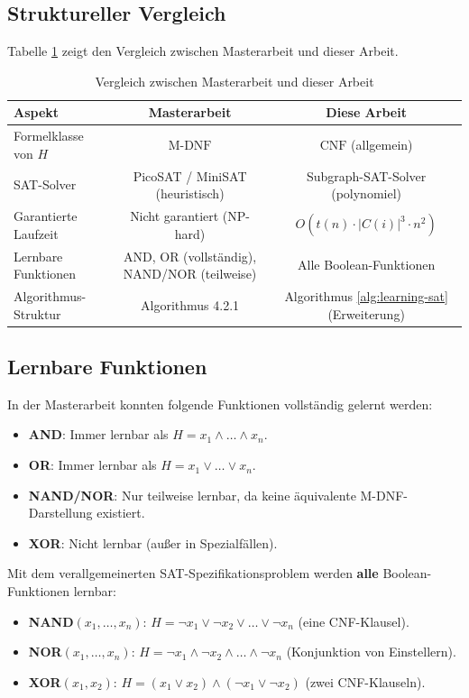 ﻿\documentclass[a4paper,12pt]{article}
\theoremstyle{definition}
\begin{document}
\subsection{Struktureller Vergleich}
Tabelle \ref{tab:vergleich} zeigt den Vergleich zwischen Masterarbeit und dieser Arbeit.
\begin{table}
    \begin{tabular}{|l|c|c|}
        \hline
        \textbf{Aspekt} & \textbf{Masterarbeit \cite{Epp13}} & \textbf{Diese Arbeit} \\
        \hline
        Formelklasse von $H$ & $\text{M-DNF}$ & $\text{CNF}$ (allgemein) \\
        SAT-Solver & PicoSAT / MiniSAT (heuristisch) & Subgraph-SAT-Solver (polynomiel) \\
        Garantierte Laufzeit & Nicht garantiert (NP-hard) & $O(t(n) \cdot |C(i)|^3 \cdot n^2)$ \\
        Lernbare Funktionen & AND, OR (vollständig), NAND/NOR (teilweise) & Alle Boolean-Funktionen \\
        Algorithmus-Struktur & Algorithmus 4.2.1 & Algorithmus \ref{alg:learning-sat} (Erweiterung) \\
        \hline
    \end{tabular}
    \caption{Vergleich zwischen Masterarbeit und dieser Arbeit}
    \label{tab:vergleich}
\end{table}

\subsection{Lernbare Funktionen}

In der Masterarbeit konnten folgende Funktionen vollständig gelernt werden:
\begin{itemize}
    \item[-] \textbf{AND}: Immer lernbar als $H = x_1 \wedge \ldots \wedge x_n$.
    \item[-] \textbf{OR}: Immer lernbar als $H = x_1 \lor \ldots \lor x_n$.
    \item[-] \textbf{NAND/NOR}: Nur teilweise lernbar, da keine äquivalente M-DNF-Darstellung existiert.
    \item[-] \textbf{XOR}: Nicht lernbar (außer in Spezialfällen).
\end{itemize}

Mit dem verallgemeinerten SAT-Spezifikationsproblem werden \textbf{alle} Boolean-Funktionen lernbar:
\begin{itemize}
    \item[-] \textbf{NAND$(x_1, \ldots, x_n)$}: $H = \neg x_1 \lor \neg x_2 \lor \ldots \lor \neg x_n$ (eine CNF-Klausel).
    \item[-] \textbf{NOR$(x_1, \ldots, x_n)$}: $H = \neg x_1 \wedge \neg x_2 \wedge \ldots \wedge \neg x_n$ (Konjunktion von Einstellern).
    \item[-] \textbf{XOR$(x_1, x_2)$}: $H = (x_1 \lor x_2) \wedge (\neg x_1 \lor \neg x_2)$ (zwei CNF-Klauseln).
\end{itemize}
\end{document}
